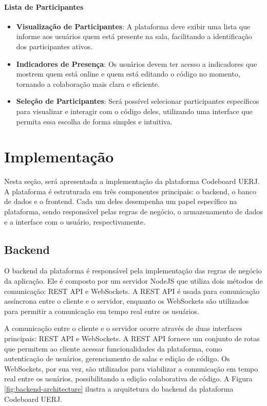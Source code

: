 \paragraph{Lista de Participantes}

\begin{itemize}
    \item \textbf{Visualização de Participantes}: A plataforma deve exibir uma lista que informe aos usuários quem está presente na sala, facilitando a identificação dos participantes ativos.
    \item \textbf{Indicadores de Presença}: Os usuários devem ter acesso a indicadores que mostrem quem está online e quem está editando o código no momento, tornando a colaboração mais clara e eficiente.
    \item \textbf{Seleção de Participantes}: Será possível selecionar participantes específicos para visualizar e interagir com o código deles, utilizando uma interface que permita essa escolha de forma simples e intuitiva.
\end{itemize}


\section{Implementação}

Nesta seção, será apresentada a implementação da plataforma Codeboard UERJ. A plataforma é estruturada em três componentes principais: o backend, o banco de dados e o frontend. Cada um deles desempenha um papel específico na plataforma, sendo responsável pelas regras de negócio, o armazenamento de dados e a interface com o usuário, respectivamente.

\subsection{Backend}

O backend da plataforma é responsável pela implementação das regras de negócio da aplicação. Ele é composto por um servidor NodeJS que utiliza dois métodos de comunicação: REST API e WebSockets. A REST API é usada para comunicação assíncrona entre o cliente e o servidor, enquanto os WebSockets são utilizados para permitir a comunicação em tempo real entre os usuários.

A comunicação entre o cliente e o servidor ocorre através de duas interfaces principais: REST API e WebSockets. A REST API fornece um conjunto de rotas que permitem ao cliente acessar funcionalidades da plataforma, como autenticação de usuários, gerenciamento de salas e edição de código. Os WebSockets, por sua vez, são utilizados para viabilizar a comunicação em tempo real entre os usuários, possibilitando a edição colaborativa de código. A Figura \ref{fig:backend-architecture} ilustra a arquitetura do backend da plataforma Codeboard UERJ.

